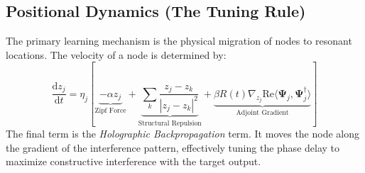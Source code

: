 \documentclass{article}
\newcommand{\D}{\mathrm{d}}
\begin{document}
\subsection{Positional Dynamics (The Tuning Rule)}
The primary learning mechanism is the physical migration of nodes to resonant locations. The velocity of a node is determined by:
\begin{equation}
    \frac{\D z_j}{\D t} = \eta_j \left[ \underbrace{-\alpha z_j}_{\text{Zipf Force}} + \underbrace{\sum_k \frac{z_j - z_k}{|z_j - z_k|^2}}_{\text{Structural Repulsion}} + \underbrace{\beta R(t) \nabla_{z_j} \text{Re}\langle \mathbf{\Psi}_j, \mathbf{\Psi}^\dagger_j \rangle}_{\text{Adjoint Gradient}} \right]
\end{equation}
The final term is the \textit{Holographic Backpropagation} term. It moves the node along the gradient of the interference pattern, effectively tuning the phase delay to maximize constructive interference with the target output.
\end{document}
